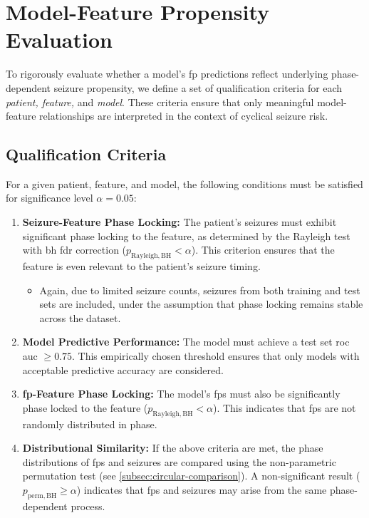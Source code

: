 \section{Model-Feature Propensity Evaluation} \label{sec:propensity-eval}

To rigorously evaluate whether a model's \gls{fp} predictions reflect underlying phase-dependent seizure propensity, we define a set of qualification criteria for each \textit{patient, feature,} and \textit{model}.
These criteria ensure that only meaningful model-feature relationships are interpreted in the context of cyclical seizure risk.

\subsection{Qualification Criteria} \label{subsec:qualification-criteria}
For a given patient, feature, and model, the following conditions must be satisfied for significance level $\alpha = 0.05$:

\begin{enumerate}
    \item \textbf{Seizure-Feature Phase Locking:} The patient's seizures must exhibit significant phase locking to the feature, as determined by the Rayleigh test with \gls{bh} \gls{fdr} correction ($p_{\mathrm{Rayleigh, BH}} < \alpha$). This criterion ensures that the feature is even relevant to the patient's seizure timing.
    \begin{itemize}
        \item Again, due to limited seizure counts, seizures from both training and test sets are included, under the assumption that phase locking remains stable across the dataset.
    \end{itemize}
    \item \textbf{Model Predictive Performance:} The model must achieve a test set \gls{roc auc} $\geq 0.75$.
    This empirically chosen threshold ensures that only models with acceptable predictive accuracy are considered.
    \item \textbf{\gls{fp}-Feature Phase Locking:} The model's \glspl{fp} must also be significantly phase locked to the feature ($p_{\mathrm{Rayleigh, BH}} < \alpha$). This indicates that \glspl{fp} are not randomly distributed in phase.
    \item \textbf{Distributional Similarity:} If the above criteria are met, the phase distributions of \glspl{fp} and seizures are compared using the non-parametric permutation test (see \cref{subsec:circular-comparison}). A non-significant result ($p_{\mathrm{perm, BH}} \geq \alpha$) indicates that \glspl{fp} and seizures may arise from the same phase-dependent process.
\end{enumerate}

